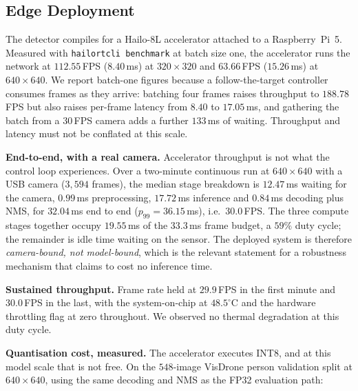 \subsection{Edge Deployment}
\label{sec:deploy}

The detector compiles for a Hailo-8L accelerator attached to a Raspberry~Pi~5.
Measured with \texttt{hailortcli benchmark} at batch size one, the accelerator
runs the network at $112.55$\,FPS ($8.40$\,ms) at $320\times320$ and $63.66$\,FPS
($15.26$\,ms) at $640\times640$. We report batch-one figures because a
follow-the-target controller consumes frames as they arrive: batching four frames
raises throughput to $188.78$\,FPS but also raises per-frame latency from $8.40$ to
$17.05$\,ms, and gathering the batch from a $30$\,FPS camera adds a further
$133$\,ms of waiting. Throughput and latency must not be conflated at this scale.

\textbf{End-to-end, with a real camera.} Accelerator throughput is not what the
control loop experiences. Over a two-minute continuous run at $640\times640$ with a
USB camera ($3{,}594$ frames), the median stage breakdown is $12.47$\,ms waiting for
the camera, $0.99$\,ms preprocessing, $17.72$\,ms inference and $0.84$\,ms decoding
plus NMS, for $32.04$\,ms end to end ($p_{99}=36.15$\,ms), i.e.\ $30.0$\,FPS. The
three compute stages together occupy $19.55$\,ms of the $33.3$\,ms frame budget, a
$59\%$ duty cycle; the remainder is idle time waiting on the sensor. The deployed
system is therefore \emph{camera-bound, not model-bound}, which is the relevant
statement for a robustness mechanism that claims to cost no inference time.

\textbf{Sustained throughput.} Frame rate held at $29.9$\,FPS in the first minute
and $30.0$\,FPS in the last, with the system-on-chip at $48.5^\circ$C and the
hardware throttling flag at zero throughout. We observed no thermal degradation at
this duty cycle.

\textbf{Quantisation cost, measured.} The accelerator executes INT8, and at this
model scale that is not free. On the $548$-image VisDrone person validation split
at $640\times640$, using the same decoding and NMS as the FP32 evaluation path:

